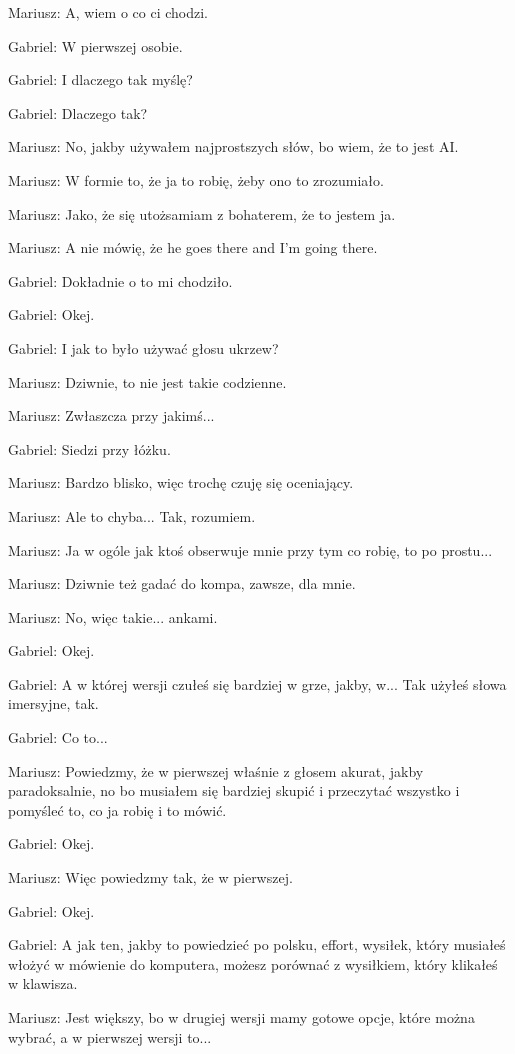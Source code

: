 Mariusz: A, wiem o co ci chodzi.

Gabriel: W pierwszej osobie.

Gabriel: I dlaczego tak myślę?

Gabriel: Dlaczego tak?

Mariusz: No, jakby używałem najprostszych słów, bo wiem, że to jest AI.

Mariusz: W formie to, że ja to robię, żeby ono to zrozumiało.

Mariusz: Jako, że się utożsamiam z bohaterem, że to jestem ja.

Mariusz: A nie mówię, że he goes there and I'm going there.

Gabriel: Dokładnie o to mi chodziło.

Gabriel: Okej.

Gabriel: I jak to było używać głosu ukrzew?

Mariusz: Dziwnie, to nie jest takie codzienne.

Mariusz: Zwłaszcza przy jakimś...

Gabriel: Siedzi przy łóżku.

Mariusz: Bardzo blisko, więc trochę czuję się oceniający.

Mariusz: Ale to chyba... Tak, rozumiem.

Mariusz: Ja w ogóle jak ktoś obserwuje mnie przy tym co robię, to po prostu...

Mariusz: Dziwnie też gadać do kompa, zawsze, dla mnie.

Mariusz: No, więc takie... ankami.

Gabriel: Okej.

Gabriel: A w której wersji czułeś się bardziej w grze, jakby, w... Tak użyłeś słowa imersyjne, tak.

Gabriel: Co to...

Mariusz: Powiedzmy, że w pierwszej właśnie z głosem akurat, jakby paradoksalnie, no bo musiałem się bardziej skupić i przeczytać wszystko i pomyśleć to, co ja robię i to mówić.

Gabriel: Okej.

Mariusz: Więc powiedzmy tak, że w pierwszej.

Gabriel: Okej.

Gabriel: A jak ten, jakby to powiedzieć po polsku, effort, wysiłek, który musiałeś włożyć w mówienie do komputera, możesz porównać z wysiłkiem, który klikałeś w klawisza.

Mariusz: Jest większy, bo w drugiej wersji mamy gotowe opcje, które można wybrać, a w pierwszej wersji to...

